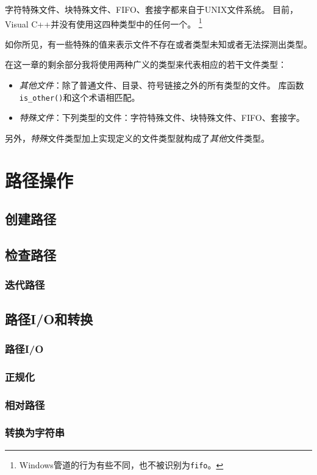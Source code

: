 字符特殊文件、块特殊文件、FIFO、套接字都来自于UNIX文件系统。
目前，Visual C++并没有使用这四种类型中的任何一个。
\footnote{Windows管道的行为有些不同，也不被识别为\texttt{fifo}。}

如你所见，有一些特殊的值来表示文件不存在或者类型未知或者无法探测出类型。

在这一章的剩余部分我将使用两种广义的类型来代表相应的若干文件类型：
\begin{itemize}
    \item \emph{其他文件}：除了普通文件、目录、符号链接之外的所有类型的文件。
    库函数\texttt{is\_other()}和这个术语相匹配。
    \item \emph{特殊文件}：下列类型的文件：字符特殊文件、块特殊文件、FIFO、套接字。
\end{itemize}
另外，\emph{特殊}文件类型加上实现定义的文件类型就构成了\emph{其他}文件类型。

\section{路径操作}

\subsection{创建路径}

\subsection{检查路径}

\subsubsection{迭代路径}

\subsection{路径I/O和转换}\label{ch20.3.3}
\subsubsection{路径I/O}
\subsubsection{正规化}
\subsubsection{相对路径}
\subsubsection{转换为字符串}

